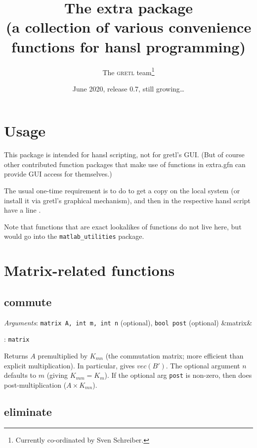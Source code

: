 \documentclass[11pt,english]{article}
\newcommand{\noun}[1]{\textsc{#1}}
\newcommand{\ArgRet}[2]{%
  {\it Arguments}: {#1}%
  \ifx&#2&%
  \else
  \par\smallskip\noindent {\it Return type}: \texttt{#2}
  \fi%
  \par\medskip\par%
  }
\begin{document}
\title{The extra package\\
(a collection of various convenience functions for hansl programming) }

\date{June 2020, release 0.7, still growing\ldots }

\author{The \noun{gretl} team\thanks{Currently co-ordinated by Sven Schreiber.}}

\maketitle
\tableofcontents{}

\section{Usage}

This package is intended for hansl scripting, not for gretl's GUI.
(But of course other contributed function packages that make use of
functions in extra.gfn can provide GUI access for themselves.)

The usual one-time requirement is to do 
to get a copy on the local system (or install it via gretl's graphical
mechanism), and then in the respective hansl script have a line .

Note that functions that are exact lookalikes of 
functions do not live here, but would go into the
\texttt{matlab\_utilities} package.


\section{Matrix-related functions}

\subsection{commute}

\ArgRet{\texttt{matrix A, int m, int n} (optional), \texttt{bool
post} (optional)}{matrix}

Returns $A$ premultiplied by $K_{mn}$ (the commutation matrix; more
efficient than explicit multiplication). In particular,  gives $vec(B')$. The optional argument $n$ defaults to
$m$ (giving $K_{mm}=K_{m}$). If the optional arg \texttt{post} is
non-zero, then does post-multiplication ($A\times K_{mn}$). 

\subsection{eliminate}
\end{document}
